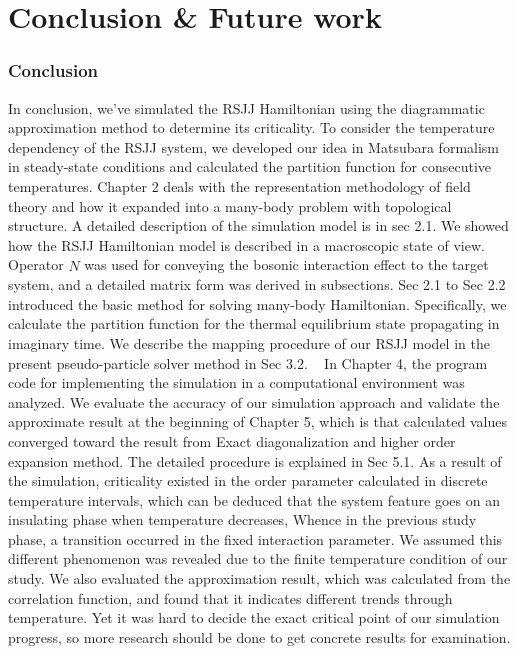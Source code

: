 \documentclass{article}[12pt]
\numberwithin{equation}{section}
\begin{document}
\section{Conclusion \& Future work}
\begin{spacing}{1.5}
\subsubsection*{Conclusion}
In conclusion, we’ve simulated the RSJJ Hamiltonian using the diagrammatic approximation method to determine its criticality. 
To consider the temperature dependency of the RSJJ system, we developed our idea in Matsubara formalism in steady-state conditions 
and calculated the partition function for consecutive temperatures. Chapter 2 deals with the representation methodology of field theory 
and how it expanded into a many-body problem with topological structure. A detailed description of the simulation model is in sec 2.1. We showed how the RSJJ Hamiltonian model 
is described in a macroscopic state of view. Operator $\hat{N}$ was used for conveying the bosonic interaction effect to the target system, 
and a detailed matrix form was derived in subsections. Sec 2.1 to Sec 2.2 introduced 
the basic method for solving many-body Hamiltonian. Specifically, 
we calculate the partition function for the thermal equilibrium state propagating in imaginary time. 
We describe the mapping procedure of our RSJJ model in the present pseudo-particle solver method in Sec 3.2.  
  In Chapter 4, the program code for implementing the simulation in a computational environment 
was analyzed. We evaluate the accuracy of our simulation approach and validate the approximate result at the beginning of Chapter 5, 
which is that calculated values converged toward the result from Exact diagonalization and higher order expansion method. 
The detailed procedure is explained in Sec 5.1. As a result of the simulation, 
criticality existed in the order parameter calculated in discrete temperature intervals, which can be deduced that the system feature goes on an insulating phase when temperature decreases, 
Whence in the previous study phase, a transition occurred in the fixed interaction parameter. 
We assumed this different phenomenon was revealed due to the finite temperature condition of our study. 
We also evaluated the approximation result, which was calculated from the correlation function, and found that it indicates different trends through temperature.
Yet it was hard to decide the exact critical point of our simulation progress, so more research should be done to get concrete results for examination. 

\end{spacing}
\end{document}
